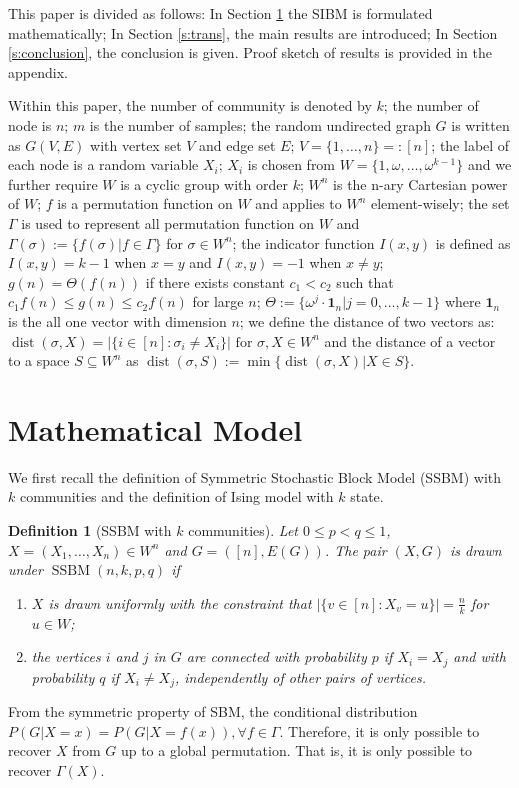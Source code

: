 \documentclass[conference]{IEEEtran}
\newtheorem{definition}{Definition}%
\DeclareMathOperator{\SSBM}{SSBM}
\DeclareMathOperator{\dist}{dist}
\begin{document}
This paper is divided as follows: In Section \ref{s:Preliminaries} the SIBM is formulated mathematically;
In Section \ref{s:trans}, the main results are introduced;
In Section \ref{s:conclusion}, the conclusion is given. Proof sketch of results is provided in the appendix.

Within this paper, the number of community is denoted by $k$; the number of node is $n$; $m$ is the number of samples; the random undirected graph $G$ is written as $G(V,E)$ with vertex set $V$ and edge set $E$;
$V=\{1,\dots, n\} =: [n]$;
the label of each node is a random variable $X_i$; $X_i$ is chosen from $W= \{1, \omega, \dots, \omega^{k-1}\}$ and we further require $W$
is a cyclic group with order $k$; $W^n$ is the n-ary Cartesian power of $W$; $f$ is a permutation function on $W$ and applies to $W^n$ element-wisely; the set $\Gamma$ is used to represent all permutation function on $W$ and $\Gamma(\sigma):=\{f(\sigma)| f\in \Gamma\}$ for $\sigma \in W^n$; the indicator function $I(x, y)$ is defined as
$I(x, y) = k-1 $ when $x=y$ and $I(x,y)=-1$ when $x\neq y$; $g(n) = \Theta(f(n))$ if there exists constant $c_1 < c_2$ such that $c_1 f(n) \leq g(n) \leq c_2 f(n)$
for large $n$;
$\Theta := \{ \omega^j  \cdot \mathbf{1}_n | j=0, \dots,k-1\}$
where $\mathbf{1}_n$ is the all one vector with dimension $n$;
we define the distance of two vectors as:
$\dist(\sigma, X)
=|\{i\in[n]:\sigma_i\neq X_i\}| \textrm{ for } \sigma,X\in W^n
$ and the distance of a vector to a space $S\subseteq W^n$
as
$\dist(\sigma,S)
:=\min\{\dist(\sigma, X) | X \in S\}
$.

\section{Mathematical Model} \label{s:Preliminaries}
We first recall the definition of Symmetric Stochastic Block Model (SSBM) with $k$ communities \cite{Abbe17} and the definition of Ising model with $k$ state.
\begin{definition}[SSBM with $k$ communities] \label{def:SSBM}
Let $0\leq p<q\leq 1$, $X=(X_1,\dots,X_n)\in W^n$ and $G=([n],E(G))$. The pair $(X,G)$ is drawn under $\SSBM(n,k,p,q)$ if 
\begin{enumerate}
\item $X$ is drawn uniformly with the constraint that $|\{v \in [n] : X_v = u\}| = \frac{n}{k}$ for $u\in W$;

\item the vertices $i$ and $j$ in $G$ are connected with probability $p$ if $X_i=X_j$ and with probability $q$ if $X_i \neq X_j$, independently of other pairs of vertices.
\end{enumerate}
\end{definition}
From the symmetric property of SBM, the conditional distribution $P(G|X=x) = P(G|X=f(x)), \forall f \in \Gamma$. Therefore, it is only possible to recover $X$ from $G$ up to a global permutation. That is, it is only possible to recover $\Gamma(X)$.
\end{document}
